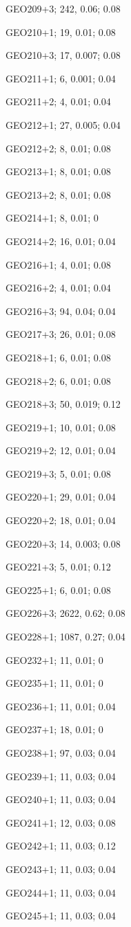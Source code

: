 GEO209+3; 242, 0.06; 0.08

GEO210+1; 19, 0.01; 0.08

GEO210+3; 17, 0.007; 0.08

GEO211+1; 6, 0.001; 0.04

GEO211+2; 4, 0.01; 0.04

GEO212+1; 27, 0.005; 0.04

GEO212+2; 8, 0.01; 0.08

GEO213+1; 8, 0.01; 0.08

GEO213+2; 8, 0.01; 0.08

GEO214+1; 8, 0.01; 0

GEO214+2; 16, 0.01; 0.04

GEO216+1; 4, 0.01; 0.08

GEO216+2; 4, 0.01; 0.04

GEO216+3; 94, 0.04; 0.04

GEO217+3; 26, 0.01; 0.08

GEO218+1; 6, 0.01; 0.08

GEO218+2; 6, 0.01; 0.08

GEO218+3; 50, 0.019; 0.12

GEO219+1; 10, 0.01; 0.08

GEO219+2; 12, 0.01; 0.04

GEO219+3; 5, 0.01; 0.08

GEO220+1; 29, 0.01; 0.04

GEO220+2; 18, 0.01; 0.04

GEO220+3; 14, 0.003; 0.08

GEO221+3; 5, 0.01; 0.12

GEO225+1; 6, 0.01; 0.08

GEO226+3; 2622, 0.62; 0.08

GEO228+1; 1087, 0.27; 0.04

GEO232+1; 11, 0.01; 0

GEO235+1; 11, 0.01; 0

GEO236+1; 11, 0.01; 0.04

GEO237+1; 18, 0.01; 0

GEO238+1; 97, 0.03; 0.04

GEO239+1; 11, 0.03; 0.04

GEO240+1; 11, 0.03; 0.04

GEO241+1; 12, 0.03; 0.08

GEO242+1; 11, 0.03; 0.12

GEO243+1; 11, 0.03; 0.04

GEO244+1; 11, 0.03; 0.04

GEO245+1; 11, 0.03; 0.04

